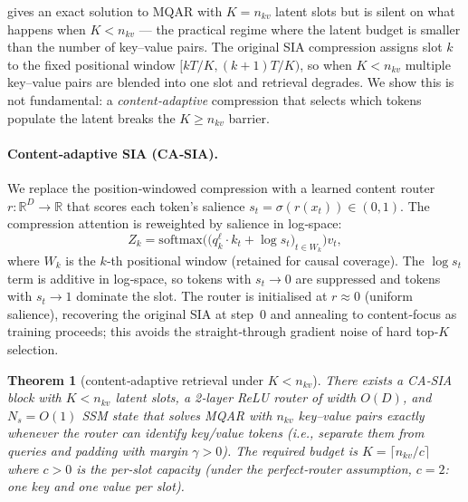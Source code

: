 \documentclass[10pt,twocolumn,letterpaper]{article}
\newcommand{\SIA}{\textsc{SIA}}
\newtheorem{theorem}{Theorem}
\begin{document}
 gives an exact solution to MQAR with $K\!=\!n_{kv}$ latent
slots but is silent on what happens when $K\!<\!n_{kv}$ — the practical
regime where the latent budget is smaller than the number of key–value
pairs.  The original \SIA{} compression assigns slot $k$ to the fixed
positional window $[kT/K,(k\!+\!1)T/K)$, so when $K\!<\!n_{kv}$ multiple
key–value pairs are blended into one slot and retrieval degrades.  We
show this is not fundamental: a \emph{content‑adaptive} compression that
selects which tokens populate the latent breaks the $K\!\geq\!n_{kv}$
barrier.

\paragraph{Content‑adaptive \SIA{} (CA‑\SIA{}).}
We replace the position‑windowed compression with a learned content
router $r\!:\!\mathbb{R}^D\!\to\!\mathbb{R}$ that scores each token's
salience $s_t\!=\!\sigma(r(x_t))\!\in\!(0,1)$.  The compression
attention is reweighted by salience in log‑space:
\begin{equation}
Z_k = \mathrm{softmax}\!\Big(\big(q_k^\ell\!\cdot\!k_t + \log s_t\big)_{t\in W_k}\Big) v_t,
\label{eq:caca}
\end{equation}
where $W_k$ is the $k$‑th positional window (retained for causal
coverage).  The $\log s_t$ term is additive in log‑space, so tokens with
$s_t\!\to\!0$ are suppressed and tokens with $s_t\!\to\!1$ dominate the
slot.  The router is initialised at $r\!\approx\!0$ (uniform salience),
recovering the original \SIA{} at step~0 and annealing to content‑focus
as training proceeds; this avoids the straight‑through gradient noise of
hard top‑$K$ selection.

\begin{theorem}[content‑adaptive retrieval under $K\!<\!n_{kv}$]
\label{thm:caca}
There exists a CA‑\SIA{} block with $K\!<\!n_{kv}$ latent slots, a
2‑layer ReLU router of width $O(D)$, and $N_s\!=\!O(1)$ SSM state that
solves MQAR with $n_{kv}$ key–value pairs exactly whenever the router
can identify key/value tokens (i.e., separate them from queries and
padding with margin $\gamma\!>\!0$).  The required budget is
$K\!=\!\lceil n_{kv}/c\rceil$ where $c\!>\!0$ is the per‑slot capacity
(under the perfect‑router assumption, $c\!=\!2$: one key and one value
per slot).
\end{theorem}
\end{document}
